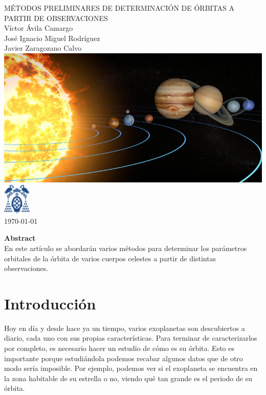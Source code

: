 \documentclass{article}
\numberwithin{equation}{section}
\begin{document}
\begin{titlepage}
    \centering
    {\Huge MÉTODOS PRELIMINARES DE DETERMINACIÓN DE ÓRBITAS A PARTIR DE OBSERVACIONES \\[1cm]}
    \vspace{1cm} %
    {\Large Víctor Ávila Camargo \\ 
    José Ignacio Miguel Rodríguez \\ 
    Javier Zaragozano Calvo \\[1cm]}
    \includegraphics[width=1\textwidth]{orbitas-del-sistema-solar-e1555647256894.jpg} \\[1cm]
    \includegraphics[width=0.1\textwidth]{aa.png} \\ [1cm]
    {\large \today}
\end{titlepage}
\newpage

\tableofcontents

\newpage

\begin{center}
\textbf{Abstract}\\
    En este artículo se abordarán varios métodos para determinar 
    los parámetros orbitales de la órbita de varios cuerpos celestes a partir de distintas observaciones.
\end{center}
\section{Introducción} %
Hoy en día y desde hace ya un tiempo, 
varios exoplanetas son descubiertos a diario, cada uno con sus propias características. 
Para terminar de caracterizarlos por completo, es necesario 
hacer un estudio de cómo es su órbita. Esto es importante porque estudiándola podemos recabar algunos 
datos que de otro modo sería imposible. 
Por ejemplo, podemos ver si el exoplaneta se encuentra en la zona habitable 
de su estrella o no, viendo qué tan grande es el periodo de su 
órbita. \\ 
\end{document}
